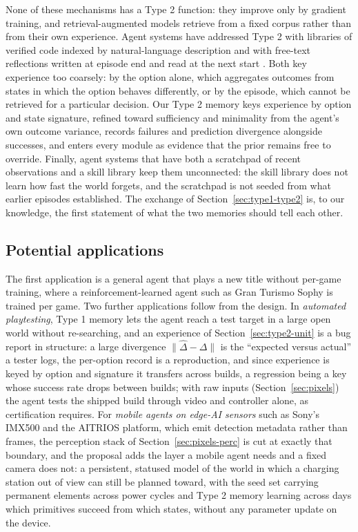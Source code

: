 \documentclass[10pt]{article}
\begin{document}
None of these mechanisms has a Type 2 function: they improve only by gradient training, and retrieval-augmented models retrieve from a fixed corpus rather than from their own experience. Agent systems have addressed Type 2 with libraries of verified code indexed by natural-language description \cite{wang2023voyager} and with free-text reflections written at episode end and read at the next start \cite{shinn2023reflexion}. Both key experience too coarsely: by the option alone, which aggregates outcomes from states in which the option behaves differently, or by the episode, which cannot be retrieved for a particular decision. Our Type 2 memory keys experience by option and state signature, refined toward sufficiency and minimality from the agent's own outcome variance, records failures and prediction divergence alongside successes, and enters every module as evidence that the prior remains free to override. Finally, agent systems that have both a scratchpad of recent observations and a skill library keep them unconnected: the skill library does not learn how fast the world forgets, and the scratchpad is not seeded from what earlier episodes established. The exchange of Section~\ref{sec:type1-type2} is, to our knowledge, the first statement of what the two memories should tell each other.

\subsection{Potential applications}
\label{sec:intro-apps}

The first application is a general agent that plays a new title without per-game training, where a reinforcement-learned agent such as Gran Turismo Sophy \cite{wurman2022sophy} is trained per game. Two further applications follow from the design. In \emph{automated playtesting}, Type 1 memory lets the agent reach a test target in a large open world without re-searching, and an experience of Section~\ref{sec:type2-unit} is a bug report in structure: a large divergence $\|\hat\Delta-\Delta\|$ is the ``expected versus actual'' a tester logs, the per-option record is a reproduction, and since experience is keyed by option and signature it transfers across builds, a regression being a key whose success rate drops between builds; with raw inputs (Section~\ref{sec:pixels}) the agent tests the shipped build through video and controller alone, as certification requires. For \emph{mobile agents on edge-AI sensors} such as Sony's IMX500 and the AITRIOS platform, which emit detection metadata rather than frames, the perception stack of Section~\ref{sec:pixels-perc} is cut at exactly that boundary, and the proposal adds the layer a mobile agent needs and a fixed camera does not: a persistent, statused model of the world in which a charging station out of view can still be planned toward, with the seed set carrying permanent elements across power cycles and Type 2 memory learning across days which primitives succeed from which states, without any parameter update on the device.
\end{document}
